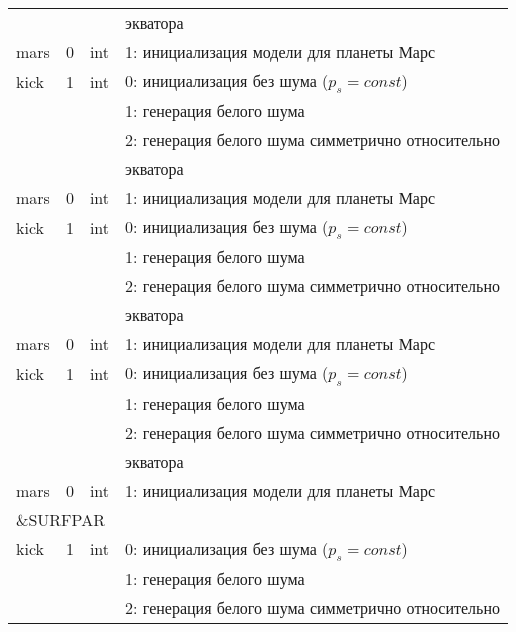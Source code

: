 \begin{longtable}[c]{|l|c|l|l|}
             &        &     & экватора                                          \\
    mars     & 0      & int & 1: инициализация модели для планеты Марс          \\
    kick     & 1      & int & 0: инициализация без шума (\(p_s = const\))       \\
             &        &     & 1: генерация белого шума                          \\
             &        &     & 2: генерация белого шума симметрично относительно \\
             &        &     & экватора                                          \\
    mars     & 0      & int & 1: инициализация модели для планеты Марс          \\
    kick     & 1      & int & 0: инициализация без шума (\(p_s = const\))       \\
             &        &     & 1: генерация белого шума                          \\
             &        &     & 2: генерация белого шума симметрично относительно \\
             &        &     & экватора                                          \\
    mars     & 0      & int & 1: инициализация модели для планеты Марс          \\
    kick     & 1      & int & 0: инициализация без шума (\(p_s = const\))       \\
             &        &     & 1: генерация белого шума                          \\
             &        &     & 2: генерация белого шума симметрично относительно \\
             &        &     & экватора                                          \\
    mars     & 0      & int & 1: инициализация модели для планеты Марс          \\
    \hline
    \multicolumn{4}{|l|}{\&SURFPAR}                                             \\ \hline
    kick     & 1      & int & 0: инициализация без шума (\(p_s = const\))       \\
             &        &     & 1: генерация белого шума                          \\
             &        &     & 2: генерация белого шума симметрично относительно \\

\end{longtable}
